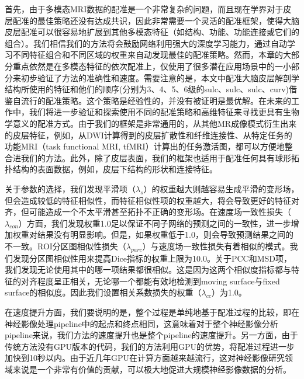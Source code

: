 首先，由于多模态MRI数据的配准是一个非常复杂的问题，而且现在学界对于皮层配准的最佳策略还没有达成共识\cite{robinson2014msm,glasser2016multi}，因此非常需要一个灵活的配准框架，使得大脑皮层配准可以很容易地扩展到其他多模态特征（如结构、功能、功能连接或它们的组合）。我们相信我们的方法将会鼓励网络利用强大的深度学习能力，通过自动学习不同特征组合和不同区域的权重来自动发现最佳的配准策略。然而，本章的大部分重点依然是在多模态特征的依次配准上，仅使用了很多潜在应用场景中的一小部分来初步验证了方法的准确性和速度。需要注意的是，本文中配准大脑皮层解剖学结构所使用的特征和他们的顺序(分别为3、4、5、6级的sulc、sulc、sulc、curv)借鉴自流行的配准策略\cite{yeo2009spherical,glasser2016multi,robinson2014msm,fischl1999high}。这个策略是经验性的，并没有被证明是最优解。在未来的工作中，我们将进一步验证和探索使用不同的配准策略和高维特征来寻找更具有生物学意义的配准方式。由于我们的框架是非常通用的，从其他MR成像模式衍生出来的皮层特征，例如，从DWI计算得到的皮层扩散性和纤维连接性\cite{li2010cortical,li2015spatiotemporal,rekik2017joint}、从特定任务的功能MRI（task functional MRI, tfMRI）计算出的任务激活图，都可以方便地整合进我们的方法。此外，除了皮层表面，我们的框架也适用于配准任何具有球形拓扑结构的表面数据，例如，皮层下结构的形状和连接特征。

关于参数的选择，我们发现平滑项（$\lambda_s$）的权重越大则越容易生成平滑的变形场，但会造成较低的特征相似性，而特征相似性项的权重越大，将会导致更好的特征对齐，但可能造成一个不太平滑甚至拓扑不正确的变形场。在速度场一致性损失（$\lambda_{con}$）方面，我们发现权重1.0足以保证不同子网络的预测之间的一致性，进一步增加权重对结果没有明显影响。但是，如果权重低于1.0，则会导致预测结果之间的不一致。ROI分区图相似性损失（$\lambda_{parc}$）与速度场一致性损失有着相似的模式。我们发现分区图相似性用来提高Dice指标的权重上限为10.0。关于PCC和MSD项，我们发现无论使用其中的哪一项结果都很相似。这是因为这两个相似度指标都与特征的对齐程度呈正相关，无论哪一个都能有效地检测到moving surface与fixed surface的相似度。因此我们设置相关系数损失的权重（$\lambda_{cc}$）为1.0。

在速度提升方面，我们要说明的是，整个过程是单纯地基于配准过程的比较，即在神经影像处理pipeline中的起点和终点相同，这意味着对于整个神经影像分析pipeline来说，我们方法的速度提升也是整个pipeline的速度提升。另一方面，由于传统方法没有GPU版本的代码，我们的方法利用GPU的优势，将配准过程进一步加快到10秒以内。由于近几年GPU在计算方面越来越流行，这对神经影像研究领域来说是一个非常有价值的贡献，可以极大地促进大规模神经影像数据的分析。

